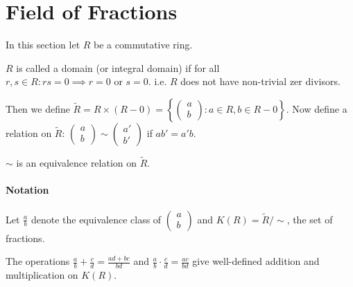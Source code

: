 \section{Field of Fractions}

In this section let \(R\) be a commutative ring.

\begin{definition}[Domain]
    \(R\) is called a domain (or integral domain) if for all \(r, s \in R: rs = 0 \implies r = 0 \text{ or } s = 0\). i.e. \(R\) does not have non-trivial zer divisors.
\end{definition}


Then we define \(\tilde{R} = R \times (R - 0) = \left\{ \begin{pmatrix}
    a \\ b
\end{pmatrix} : a \in R, b \in R - 0 \right\}\). Now define a relation on \(\tilde{R}\): \(\begin{pmatrix}
    a \\ b
\end{pmatrix} \sim \begin{pmatrix}
    a' \\ b'
\end{pmatrix}\) if \(ab' = a'b\).

\begin{lemma}
    \(\sim\) is an equivalence relation on \(\tilde{R}\).
\end{lemma}

\paragraph{Notation}
Let \(\frac{a}{b}\) denote the equivalence class of \(\begin{pmatrix} a \\ b \end{pmatrix}\) and \(K(R) = \tilde{R} / \sim\), the set of fractions.

\begin{lemma}
    The operations \(\frac{a}{b} + \frac{c}{d} = \frac{ad + bc}{bd}\) and \(\frac{a}{b} \cdot \frac{c}{d} = \frac{ac}{bd}\) give well-defined addition and multiplication on \(K(R)\).
\end{lemma}

